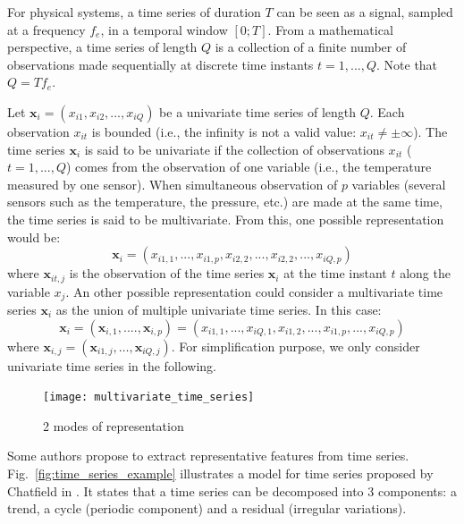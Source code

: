 For physical systems, a time series of duration $T$ can be seen as a signal, sampled at a frequency $f_e$, in a temporal window $[0;T]$. From a mathematical perspective, a time series of length $Q$ is a collection of a finite number of observations made sequentially at discrete time instants $t=1,...,Q$. Note that $Q=Tf_e$. 

Let $\textbf{x}_i=(x_{i1}, x_{i2}, ..., x_{iQ})$ be a univariate time series of length $Q$. Each observation $x_{it}$ is bounded (i.e., the infinity is not a valid value: $x_{it} \neq \pm \infty$). The time series $\textbf{x}_i$ is said to be univariate if the collection of observations $x_{it}$ ($t=1,...,Q$) comes from the observation of one variable (i.e., the temperature measured by one sensor). When simultaneous observation of $p$ variables (several sensors such as the temperature, the pressure, etc.) are made at the same time, the time series is said to be multivariate. From this, one possible representation would be: 
\begin{equation*}
	\textbf{x}_i=(x_{i1,1}, ..., x_{i1,p},x_{i2,2}, ..., x_{i2,2}, ..., x_{iQ,p})
\end{equation*}
\noindent where $\textbf{x}_{it,j}$ is the observation of the time series $\textbf{x}_{i}$ at the time instant $t$ along the variable $x_j$. An other possible representation could consider a multivariate time series $\textbf{x}_i$ as the union of multiple univariate time series. In this case: 
\begin{equation*}
	\textbf{x}_i=(\textbf{x}_{i,1}, ...., \textbf{x}_{i,p})=(x_{i1,1}, ..., x_{iQ,1},x_{i1,2}, ..., x_{i1,p}, ..., x_{iQ,p})
\end{equation*}
where $\textbf{x}_{i,j} = (\textbf{x}_{i1,j}, \ldots, \textbf{x}_{iQ,j})$. For simplification purpose, we only consider univariate time series in the following. 

\begin{figure}[h!]
	\centering
	\texttt{[image: multivariate\_time\_series]}
	\caption{2 modes of representation}
	\label{fig:multivarite_time_series}
\end{figure}

Some authors propose to extract representative features from time series. Fig.~\ref{fig:time_series_example} illustrates a model for time series proposed by Chatfield in \cite{Chatfield2004}. It states that a time series can be decomposed into 3 components: a trend, a cycle (periodic component) and a residual (irregular variations). 

